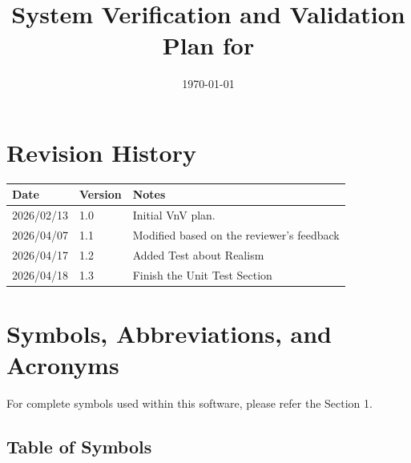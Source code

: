 \documentclass[12pt, titlepage]{article}
\begin{document}
\title{System Verification and Validation Plan for \progname{}} 
\author{\authname}
\date{\today}
	
\maketitle


\section*{Revision History}

\begin{tabularx}{\textwidth}{p{3cm}p{2cm}X}
\toprule {\bf Date} & {\bf Version} & {\bf Notes}\\
\midrule
2026/02/13 & 1.0 & Initial VnV plan.\\
2026/04/07 & 1.1 & Modified based on the reviewer's feedback\\
2026/04/17 & 1.2 & Added Test about Realism \\
2026/04/18 & 1.3 & Finish the Unit Test Section \\
\bottomrule
\end{tabularx}


\newpage

\tableofcontents

\listoftables

\newpage

\section{Symbols, Abbreviations, and Acronyms}

For complete symbols used within this software, please refer 
the \citet{SRS} Section 1.

\subsection{Table of Symbols}
\end{document}
